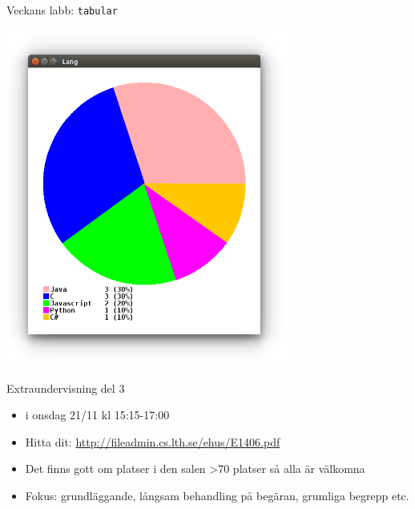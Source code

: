 \begin{Slide}{Veckans labb: \texttt{tabular}}
\begin{minipage}{0.3\textwidth}
\vspace{2em}\includegraphics[width=0.7\textwidth]{../img/survey/pie}
\end{minipage}
\end{Slide}

\begin{Slide}{Extraundervisning del 3}
\begin{itemize}
\item  {} i  onsdag 21/11 kl 15:15-17:00
\item Hitta dit: \url{http://fileadmin.cs.lth.se/ehus/E1406.pdf}
\item Det finns gott om platser i den salen >70 platser så alla är välkomna
\item Fokus: grundläggande, långsam behandling på begäran, grumliga begrepp etc.
\end{itemize}
\end{Slide}


